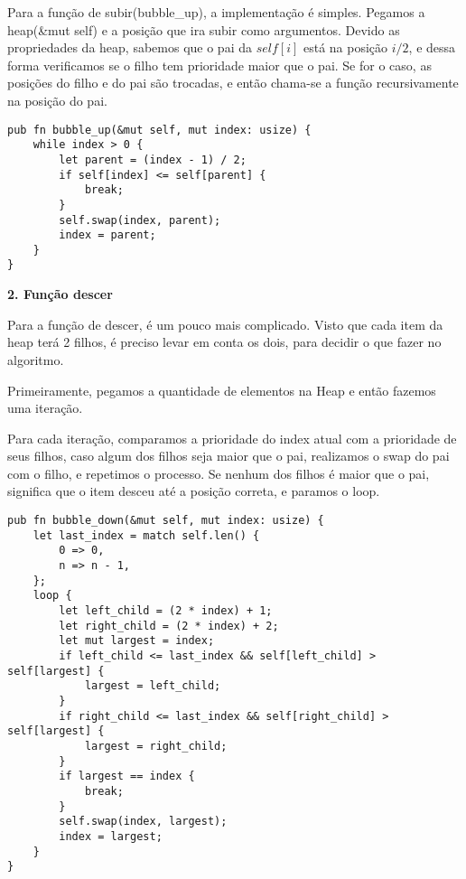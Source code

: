 \vspace{3mm}

Para a função de subir(bubble\_up), a implementação é simples.
Pegamos a heap(\&mut self) e a posição que ira subir como argumentos.
Devido as propriedades da heap, sabemos que o pai da $self[i]$ está na
posição $i/2$, e dessa forma verificamos se o filho tem prioridade maior que o pai.
Se for o caso, as posições do filho e do pai são trocadas,
e então chama-se a função recursivamente na posição do pai.


\begin{lstlisting}
pub fn bubble_up(&mut self, mut index: usize) {
    while index > 0 {
        let parent = (index - 1) / 2;
        if self[index] <= self[parent] {
            break;
        }
        self.swap(index, parent);
        index = parent;
    }
}
\end{lstlisting}

\vspace{3mm}

\textbf{2. Função descer} 

\vspace{3mm}

Para a função de descer, é um pouco mais complicado. Visto que cada item da heap terá 2 filhos,
é preciso levar em conta os dois, para decidir o que fazer no algoritmo.


Primeiramente, pegamos a quantidade de elementos na Heap e então fazemos uma iteração.

Para cada iteração, comparamos a prioridade do index atual com a prioridade de seus filhos,
caso algum dos filhos seja maior que o pai, realizamos o swap do pai com o filho, e
repetimos o processo.
Se nenhum dos filhos é maior que o pai, significa que o item desceu até a posição correta,
e paramos o loop.

\begin{lstlisting}
pub fn bubble_down(&mut self, mut index: usize) {
    let last_index = match self.len() {
        0 => 0,
        n => n - 1,
    };
    loop {
        let left_child = (2 * index) + 1;
        let right_child = (2 * index) + 2;
        let mut largest = index;
        if left_child <= last_index && self[left_child] > self[largest] {
            largest = left_child;
        }
        if right_child <= last_index && self[right_child] > self[largest] {
            largest = right_child;
        }
        if largest == index {
            break;
        }
        self.swap(index, largest);
        index = largest;
    }
}
\end{lstlisting}

